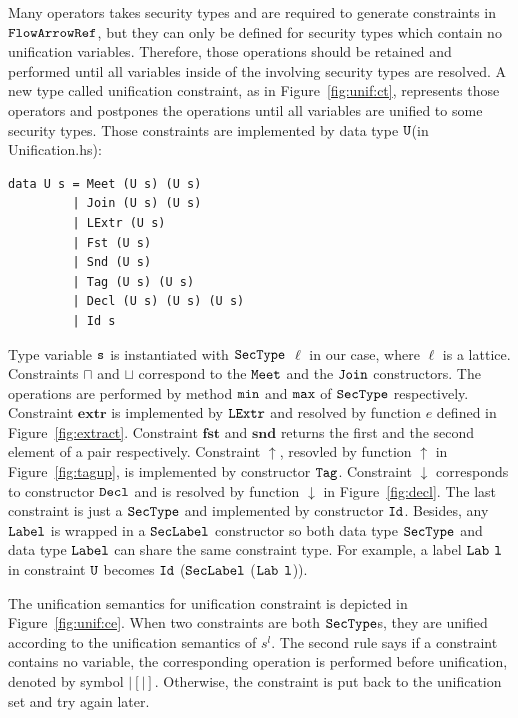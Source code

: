 \documentclass[a4paper]{report}
\newcommand{\co}[1]{$\cod{#1}$}
\newcommand{\st}{s^l}
\newcommand{\tagup}{\uparrow}
\newcommand{\decl}{\downarrow}
\begin{document}
Many operators takes security types and are required to generate constraints in \co{FlowArrowRef}, but
they can only be defined for security types which contain no unification variables. 
Therefore, those operations should be retained and performed until all variables inside of the involving
security types are resolved. A new type called unification constraint, as in Figure~\ref{fig:unif:ct}, 
represents those operators and postpones the operations until all variables are unified to some
security types.
Those constraints are implemented by data type \co{U}(in Unification.hs):
\begin{Verbatim}[fontsize=\footnotesize]
data U s = Meet (U s) (U s)
         | Join (U s) (U s)
         | LExtr (U s)
         | Fst (U s)
         | Snd (U s)
         | Tag (U s) (U s)
         | Decl (U s) (U s) (U s)
         | Id s
\end{Verbatim}
Type variable \co{s} is instantiated with \co{SecType} $\ell$ in our case, where $\ell$ is a lattice. 
Constraints $\sqcap$ and $\sqcup$ correspond to the \co{Meet} and the \co{Join} constructors. 
The operations are performed by method \co{min} and \co{max} of \co{SecType} respectively. 
Constraint $\mathbf{extr}$ is implemented by \co{LExtr} and resolved by function $e$ defined
in Figure~\ref{fig:extract}.
Constraint $\mathbf{fst}$ and $\mathbf{snd}$ returns the first and the second element of a pair respectively.
Constraint $\tagup$, resovled by function $\tagup$ in Figure~\ref{fig:tagup}, 
is implemented by constructor \co{Tag}.
Constraint $\decl$ corresponds to constructor \co{Decl} and is resolved by function $\decl$ in 
Figure~\ref{fig:decl}. 
The last constraint is just a \co{SecType} and implemented by constructor \co{Id}.
Besides, any \co{Label} is wrapped in a \co{SecLabel} constructor so both data type \co{SecType} and data type 
\co{Label} can share the same constraint type. For example, a label \co{Lab} \co{l} in constraint \co{U} 
becomes \co{Id} (\co{SecLabel} (\co{Lab} \co{l})).

The unification semantics for unification constraint is depicted in Figure~\ref{fig:unif:ce}. When two constraints
are both \co{SecType}s, they are unified according to the unification semantics of $\st$. The second rule says
if a constraint contains no variable, the corresponding operation is performed before unification, 
denoted by symbol $|[|]$. Otherwise, the constraint is put back to the unification set and try again later.
\end{document}
